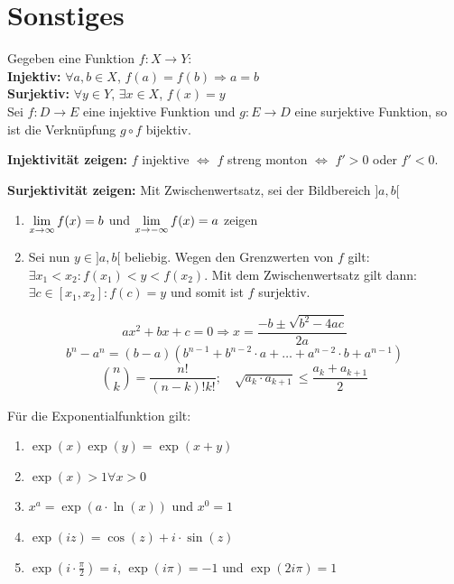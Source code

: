 \section{Sonstiges}



Gegeben eine Funktion $f : X \to Y$: \smallskip \\
\quad \textbf{Injektiv:} $\forall a,b \in X$, $f(a) = f(b) \Rightarrow a = b$ \\
\quad \textbf{Surjektiv:} $\forall y \in Y$, $\exists x \in X$, $f(x) = y$  \smallskip \\
Sei $f : D \to E$ eine injektive Funktion und $g : E \to D$ eine surjektive Funktion, so ist die
Verknüpfung $g \circ f$ bijektiv. \medskip

\textbf{Injektivität zeigen:} $f$ injektive $\Leftrightarrow$ $f$ streng monton $\Leftrightarrow$ $f' > 0$ 
oder $f' < 0$. \medskip

\textbf{Surjektivität zeigen:} Mit Zwischenwertsatz, sei der Bildbereich $]a,b[$
\begin{enumerate}[label = (\arabic*)]
        \item $\lim\limits_{x \to \infty} f(x) = b$ und $\lim\limits_{x \to - \infty} f(x) = a$ zeigen
        \item Sei nun $y \in ]a,b[$ beliebig. Wegen den Grenzwerten von $f$ gilt: $\exists x_1 < x_2
        : f(x_1) < y < f(x_2)$. Mit dem Zwischenwertsatz gilt dann: $\exists c \in [x_1, x_2] : f(c) = y$
        und somit ist $f$ surjektiv.
\end{enumerate}


$$ax^2 + bx + c = 0 \Rightarrow x = \frac{-b \pm \sqrt{b^2 - 4ac}}{2a}$$
$$b^n- a^n = (b-a)(b^{n-1}+b^{n-2}\cdot a + \dots + a^{n-2}\cdot b + a^{n-1})$$
$$\binom{n}{k} = \frac{n!}{(n-k)!k!}; \quad \sqrt{a_k\cdot a_{k+1}} \leq \frac{a_k + a_{k+1}}{2}$$



Für die Exponentialfunktion gilt:
\begin{enumerate}[label = (\arabic*)]
	\item $\exp(x) \exp(y) = \exp(x+y)$
	\item $\exp(x) > 1 \forall x > 0$
	\item $x^a = \exp(a \cdot \ln(x))$ und $x^0 = 1$
	\item $\exp(iz) = \cos(z) + i \cdot \sin(z)$
	\item $\exp(i \cdot \frac{\pi}{2}) = i$, $\exp(i \pi) = -1$ und $\exp(2 i \pi) = 1$
\end{enumerate}

